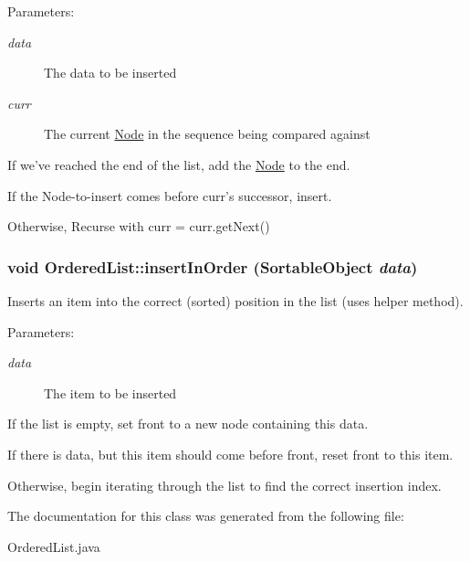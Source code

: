 \begin{Desc}
\item[Parameters:]
\begin{description}
\item[{\em data}]The data to be inserted \item[{\em curr}]The current \hyperlink{class_node}{Node} in the sequence being compared against \end{description}
\end{Desc}


If we've reached the end of the list, add the \hyperlink{class_node}{Node} to the end.

If the Node-to-insert comes before curr's successor, insert.

Otherwise, Recurse with curr = curr.getNext() \hypertarget{class_ordered_list_f5ee8de5685273568603e1cb63e19195}{
\subsubsection[{insertInOrder}]{\setlength{\rightskip}{0pt plus 5cm}void OrderedList::insertInOrder ({\bf SortableObject} {\em data})}}
\label{class_ordered_list_f5ee8de5685273568603e1cb63e19195}


Inserts an item into the correct (sorted) position in the list (uses helper method). 

\begin{Desc}
\item[Parameters:]
\begin{description}
\item[{\em data}]The item to be inserted \end{description}
\end{Desc}


If the list is empty, set front to a new node containing this data.

If there is data, but this item should come before front, reset front to this item.

Otherwise, begin iterating through the list to find the correct insertion index. 

The documentation for this class was generated from the following file:\begin{CompactItemize}
\item 
OrderedList.java\end{CompactItemize}
